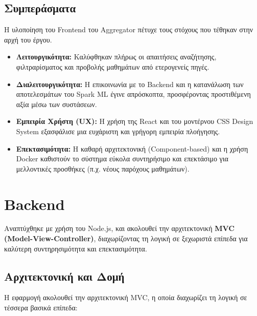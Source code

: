 \documentclass[a4paper,12pt]{article}
\begin{document}
\subsection{Συμπεράσματα}

Η υλοποίηση του Frontend του Aggregator πέτυχε τους στόχους που τέθηκαν στην αρχή του έργου.

\begin{itemize}
    \item \textbf{Λειτουργικότητα:} Καλύφθηκαν πλήρως οι απαιτήσεις αναζήτησης, φιλτραρίσματος και προβολής μαθημάτων από ετερογενείς πηγές.
    \item \textbf{Διαλειτουργικότητα:} Η επικοινωνία με το Backend και η κατανάλωση των αποτελεσμάτων του Spark ML έγινε απρόσκοπτα, προσφέροντας προστιθέμενη αξία μέσω των συστάσεων.
    \item \textbf{Εμπειρία Χρήστη (UX):} Η χρήση της React και του μοντέρνου CSS Design System εξασφάλισε μια ευχάριστη και γρήγορη εμπειρία πλοήγησης.
    \item \textbf{Επεκτασιμότητα:} Η καθαρή αρχιτεκτονική (Component-based) και η χρήση Docker καθιστούν το σύστημα εύκολα συντηρήσιμο και επεκτάσιμο για μελλοντικές προσθήκες (π.χ. νέους παρόχους μαθημάτων).
\end{itemize}

\section{Backend}
Αναπτύχθηκε με χρήση του Node.js, και ακολουθεί την αρχιτεκτονική \textbf{MVC (Model-View-Controller)}, διαχωρίζοντας τη λογική σε ξεχωριστά επίπεδα για καλύτερη συντηρησιμότητα και επεκτασιμότητα.

\subsection{Αρχιτεκτονική και Δομή}

Η εφαρμογή ακολουθεί την αρχιτεκτονική MVC, η οποία διαχωρίζει τη λογική σε τέσσερα βασικά επίπεδα:
\end{document}
